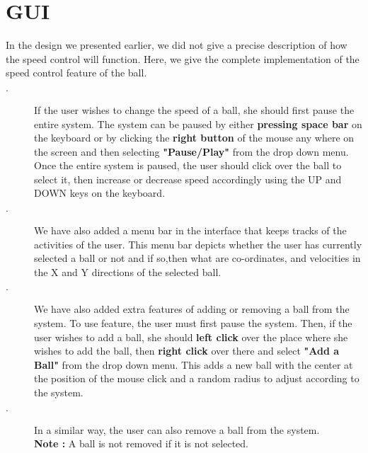 \section{GUI}
In the design we presented earlier, we did not give a precise description of how the speed control will function. Here, we give the complete implementation of the speed control feature of the ball.
\begin{description}
\item[$\cdot$]If the user wishes to change the speed of a ball, she should first pause the entire system. The system can be paused by either\textbf{ pressing space bar} on the keyboard or by clicking the \textbf{right button} of the mouse any where on the screen and then selecting\textbf{ "Pause/Play"} from the drop down menu. Once the entire system is paused, the user should click over the ball to select it, then increase or decrease speed accordingly using the UP and DOWN keys on the keyboard.

\item[$\cdot$]We have also added a menu bar in the interface that keeps tracks of the activities of the user. This menu bar depicts whether the user has currently selected a ball or not and if so,then what are co-ordinates, and velocities in the X and Y directions of the selected ball.

\item[$\cdot$]We have also added extra features of adding or removing a ball from the system. To use feature, the user must first pause the system. Then, if the user wishes to add a ball, she should \textbf{left click} over the place where she wishes to add the ball, then \textbf{right click} over there and select \textbf{"Add a Ball"} from the drop down menu. This adds a new ball with the center at the position of the mouse click and a random radius to adjust according to the system. 

\item[$\cdot$]In a similar way, the user can also remove a ball from the system.
\\\textbf{Note :} A ball is not removed if it is not selected.
\end{description}

 
